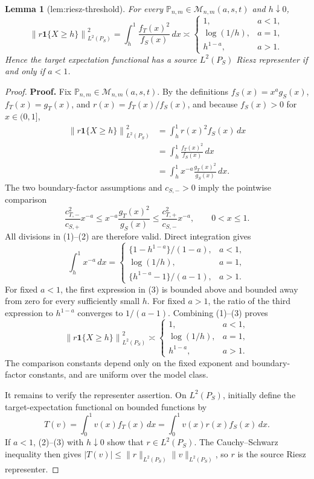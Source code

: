 \documentclass{article}
\newtheorem{lemma}{Lemma}
\begin{document}
\begin{lemma}[lem:riesz-threshold]\label{lem:riesz-threshold}
For every \(\mathbb P_{n,m}\in\mathcal M_{n,m}(a,s,t)\) and \(h\downarrow0\), \[\left\|r\mathbf 1\{X\ge h\}\right\|_{L^2(P_S)}^2=\int_h^1\frac{f_T(x)^2}{f_S(x)}\,dx\asymp\begin{cases}1,&a<1,\\ \log(1/h),&a=1,\\ h^{1-a},&a>1.\end{cases}\] Hence the target expectation functional has a source \(L^2(P_S)\) Riesz representer if and only if \(a<1\).
\end{lemma}
\begin{proof}
\textbf{Proof.}
Fix \(\mathbb P_{n,m}\in\mathcal M_{n,m}(a,s,t)\). By the definitions \(f_S(x)=x^ag_S(x)\), \(f_T(x)=g_T(x)\), and \(r(x)=f_T(x)/f_S(x)\), and because \(f_S(x)>0\) for \(x\in(0,1]\),
\[
\begin{aligned}
\left\|r\mathbf 1\{X\ge h\}\right\|_{L^2(P_S)}^2
&=\int_h^1r(x)^2f_S(x)\,dx\\
&=\int_h^1\frac{f_T(x)^2}{f_S(x)}\,dx\\
&=\int_h^1x^{-a}\frac{g_T(x)^2}{g_S(x)}\,dx.
\end{aligned}
\tag{1}
\]
The two boundary-factor assumptions and \(c_{S,-}>0\) imply the pointwise comparison
\[
\frac{c_{T,-}^2}{c_{S,+}}x^{-a}
\le x^{-a}\frac{g_T(x)^2}{g_S(x)}
\le\frac{c_{T,+}^2}{c_{S,-}}x^{-a},
\qquad 0<x\le1.
\tag{2}
\]
All divisions in (1)--(2) are therefore valid. Direct integration gives
\[
\int_h^1x^{-a}\,dx=
\begin{cases}
\{1-h^{1-a}\}/(1-a),&a<1,\\
\log(1/h),&a=1,\\
\{h^{1-a}-1\}/(a-1),&a>1.
\end{cases}
\tag{3}
\]
For fixed \(a<1\), the first expression in (3) is bounded above and bounded away from zero for every sufficiently small \(h\). For fixed \(a>1\), the ratio of the third expression to \(h^{1-a}\) converges to \(1/(a-1)\). Combining (1)--(3) proves
\[
\left\|r\mathbf 1\{X\ge h\}\right\|_{L^2(P_S)}^2
\asymp
\begin{cases}
1,&a<1,\\
\log(1/h),&a=1,\\
h^{1-a},&a>1.
\end{cases}
\tag{4}
\]
The comparison constants depend only on the fixed exponent and boundary-factor constants, and are uniform over the model class.

It remains to verify the representer assertion. On \(L^2(P_S)\), initially define the target-expectation functional on bounded functions by
\[
T(v)=\int_0^1v(x)f_T(x)\,dx
=\int_0^1v(x)r(x)f_S(x)\,dx.
\tag{5}
\]
If \(a<1\), (2)--(3) with \(h\downarrow0\) show that \(r\in L^2(P_S)\). The Cauchy--Schwarz inequality then gives \(|T(v)|\le\|r\|_{L^2(P_S)}\|v\|_{L^2(P_S)}\), so \(r\) is the source Riesz representer.


\end{proof}
\end{document}
